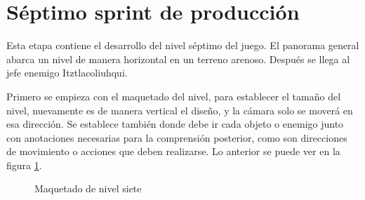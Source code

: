 
\section{Séptimo sprint de producción}

Esta etapa contiene el desarrollo del nivel séptimo del juego. El panorama general abarca un nivel de manera horizontal en un terreno arenoso. Después se llega al jefe enemigo Itztlacoliuhqui.

Primero se empieza con el maquetado del nivel, para establecer el tamaño del nivel, nuevamente es de manera vertical el diseño, y la cámara solo se moverá en esa dirección. Se establece también donde debe ir cada objeto o enemigo junto con anotaciones necesarias para la comprensión posterior, como son direcciones de movimiento o acciones que deben realizarse. Lo anterior se puede ver en la figura \ref{fig:n701}.
\begin{figure}[htbp]
	\centering
	\caption{Maquetado de nivel siete} \label{fig:n701}
\end{figure}  

